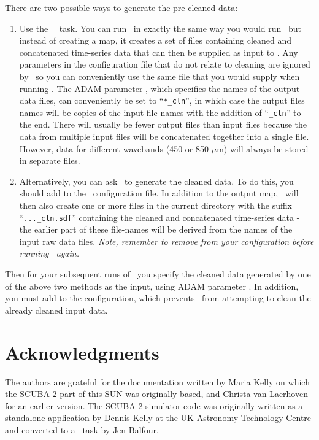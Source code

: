 \documentclass[oneside,11pt]{starlink}
\begin{document}
There are two possible ways to generate the pre-cleaned data:

\begin{enumerate}

\item Use the \SMURF\ \clean\ task. You can run \clean\ in exactly the
same way you would run \makemap\ but instead of creating a map, it
creates a set of files containing cleaned and concatenated time-series
data that can then be supplied as input to \makemap. Any parameters in
the configuration file that do not relate to cleaning are ignored by
\clean\, so you can conveniently use the same file that you would supply
when running \makemap. The ADAM parameter , which specifies
the names of the output data files, can conveniently be set to
``\texttt{*\_cln}'', in which case the output files names will be copies
of the input file names with the addition of ``\texttt{\_cln}'' to the
end. There will usually be fewer output files than input files because
the data from multiple input files will be concatenated together into a
single file. However, data for different wavebands (450 or 850 $\mu$m)
will always be stored in separate files.

\item Alternatively, you can ask \makemap\ to generate the cleaned data.
To do this, you should add  to the \makemap\ configuration
file. In addition to the output map, \makemap\ will then also create one or
more files in the current directory with the suffix ``\texttt{...\_cln.sdf}''
containing the cleaned and concatenated time-series data - the earlier part of
these file-names will be derived from the names of the input raw data
files. \emph{Note, remember to remove  from your
configuration before running \makemap\ again.}

\end{enumerate}

Then for your subsequent runs of \makemap\, you specify the cleaned data
generated by one of the above two methods as the input, using ADAM
parameter . In addition, you must add  to
the configuration, which prevents \makemap\ from attempting to clean the
already cleaned input data.

\section{Acknowledgments}

The authors are grateful for the documentation written by Maria Kelly
on which the SCUBA-2 part of this SUN was originally based, and
Christa van Laerhoven for an earlier version. The SCUBA-2 simulator
code was originally written as a standalone application by Dennis
Kelly at the UK Astronomy Technology Centre and converted to a \SMURF\
task by Jen Balfour.
\end{document}
